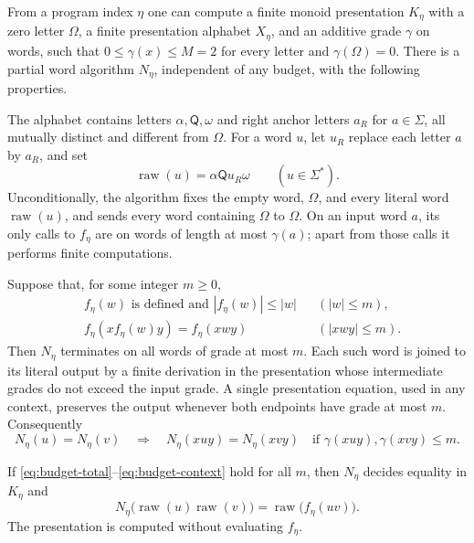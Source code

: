 \begin{lemma}\label{lem:compiler}
From a program index $\eta$ one can compute a finite monoid presentation
$K_\eta$ with a zero letter $\Omega$, a finite presentation alphabet
$X_\eta$, and an additive grade $\gamma$ on words, such that
$0\le\gamma(x)\le M=2$ for every letter and $\gamma(\Omega)=0$.
There is a partial word algorithm $N_\eta$, independent of any budget,
with the following properties.

The alphabet contains letters $\alpha,\mathsf Q,\omega$ and right
anchor letters $a_R$ for $a\in\Sigma$, all mutually distinct and
different from $\Omega$. For a word $u$, let $u_R$ replace each
letter $a$ by $a_R$, and set
\[
 \operatorname{raw}(u)=\alpha\mathsf Q u_R\omega\qquad(u\in\Sigma^*).
\]
Unconditionally, the algorithm fixes the empty word, $\Omega$, and
every literal word $\operatorname{raw}(u)$, and sends every word
containing $\Omega$ to $\Omega$. On an input word $a$, its only calls
to $f_\eta$ are on words of length at most $\gamma(a)$; apart from
those calls it performs finite computations.

Suppose that, for some integer $m\ge0$,
\begin{align}
 &f_\eta(w)\text{ is defined and }|f_\eta(w)|\le |w|
       &&(|w|\le m),\label{eq:budget-total}\\
 &f_\eta(xf_\eta(w)y)=f_\eta(xwy)
       &&(|xwy|\le m).\label{eq:budget-context}
\end{align}
Then $N_\eta$ terminates on all words of grade at most $m$.
Each such word is joined to its literal output by a finite derivation
in the presentation whose intermediate grades do not exceed the input
grade.  A single presentation equation, used in any context, preserves
the output whenever both endpoints have grade at most $m$.
Consequently
\begin{equation}\label{eq:bounded-context}
 N_\eta(u)=N_\eta(v)\quad\Longrightarrow\quad
 N_\eta(xuy)=N_\eta(xvy)
 \quad\text{if }\gamma(xuy),\gamma(xvy)\le m.
\end{equation}

If
\eqref{eq:budget-total}--\eqref{eq:budget-context} hold for all $m$,
then $N_\eta$ decides equality in $K_\eta$ and
\begin{equation}\label{eq:raw-product}
 N_\eta\bigl(\operatorname{raw}(u)\operatorname{raw}(v)\bigr)=\operatorname{raw}\bigl(f_\eta(uv)\bigr).
\end{equation}
The presentation is computed without evaluating $f_\eta$.
\end{lemma}

